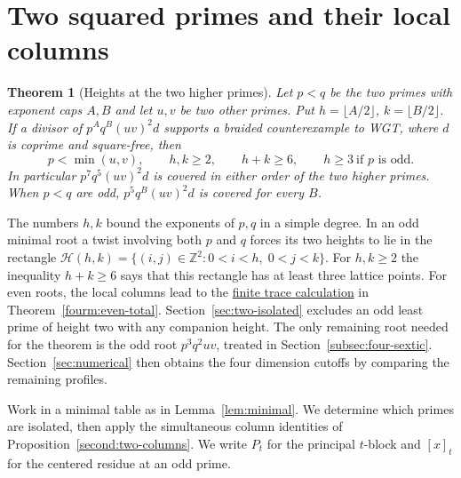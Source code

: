 \documentclass[11pt,a4paper]{article}
\numberwithin{equation}{section}
\newtheorem{theorem}{Theorem}[section]
\theoremstyle{remark}
\newcommand{\ZZ}{\mathbb Z}
\begin{document}
\section{Two squared primes and their local columns}\label{fam:M:sec:8}\label{sec:four}\label{sec:two-squared}
\begin{theorem}[Heights at the two higher primes]\label{fam:M:8.1}\label{thm:higher-two-squares}\label{main:four}\label{seq:four-five}
Let $p<q$ be the two primes with exponent caps $A,B$ and let $u,v$ be
two other primes. Put $h=\lfloor A/2\rfloor$, $k=\lfloor B/2\rfloor$.
If a divisor of $p^Aq^B(uv)^2d$ supports a braided counterexample to WGT,
where $d$ is coprime and square-free, then
\[
 p<\min(u,v),\qquad h,k\ge2,\qquad h+k\ge6,\qquad
 h\ge3\ \text{if }p\text{ is odd}.
\]
In particular $p^7q^5(uv)^2d$ is covered in either order of the two
higher primes. When $p<q$ are odd, $p^5q^B(uv)^2d$ is covered for
every $B$.
\end{theorem}
The numbers $h,k$ bound the exponents of $p,q$ in a simple degree.
In an odd minimal root a twist involving both $p$ and $q$ forces
its two heights to lie in the
rectangle $\mathcal H(h,k)=\{(i,j)\in\ZZ^2:0<i<h,\;0<j<k\}$.
For $h,k\ge2$ the inequality $h+k\ge6$ says that this rectangle
has at least three lattice points. For even roots, the local columns lead to the \href{https://github.com/sebastienpalcoux/WGT-fusion-categories/blob/f7f9f9a02f3116e61eb9dca4eebfed77001494e8/code/four_primes/dyadic_total_height.py}{finite trace calculation} in Theorem~\ref{fourm:even-total}. Section~\ref{sec:two-isolated} excludes an odd
least prime of height two with any companion height. The only
remaining root needed for the theorem is the odd root $p^3q^2uv$,
treated in Section~\ref{subsec:four-sextic}. Section~\ref{sec:numerical}
then obtains the four dimension cutoffs by comparing the remaining profiles.

Work in a minimal table as in Lemma~\ref{lem:minimal}. We determine
which primes are isolated, then apply the simultaneous column identities
of Proposition~\ref{second:two-columns}. We write $P_t$ for the
principal $t$-block and $[x]_t$ for the centered residue at an odd prime.
\end{document}
